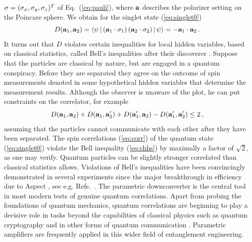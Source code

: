 \documentclass[12pt,amsmath,amssymb]{article}
\numberwithin{equation}{section}
\begin{document}
${\bf \sigma} = (\sigma_x, \sigma_y, \sigma_z)^T$
of Eq.\ (\ref{eq:pauli}), where
${\bf a}$ describes the polarizer setting on the Poincare sphere.
We obtain for the singlet state (\ref{eq:singlet0})
\begin{equation}
\label{eq:corr}
D({\bf a}_1, {\bf a}_2)=
\langle\psi\,|\, ({\bf a}_1 \cdot {\bf \sigma}_1)\,
({\bf a}_2 \cdot {\bf \sigma}_2)\,|\,\psi\rangle
= -{\bf a}_1 \cdot {\bf a}_2 \,.
\end{equation}
It turns out \cite{Bellpaper,Bell}
that $D$ violates certain inequalities for local hidden variables,
based on classical statistics,
called Bell's inequalities after their discoverer \cite{Bellpaper}.
Suppose that the particles are classical by nature, but are engaged
in a quantum conspiracy.
Before they are separated they agree on the outcome of
spin measurements denoted in
some hypothetical hidden variables that determine the
measurement results.
Although the observer is unaware of the plot,
he can put constraints on the correlator,
for example \cite{CHHS,CS}
\begin{equation}
\label{eq:chhs}
D({\bf a}_1, {\bf a}_2) +
D({\bf a}_1, {\bf a}_2') +
D({\bf a}_1', {\bf a}_2) -
D({\bf a}_1', {\bf a}_2') \le 2\,,
\end{equation}
assuming that the particles
cannot communicate with each other after they have been separated.
The spin correlations (\ref{eq:corr}) of the quantum state
(\ref{eq:singlet0}) violate the Bell inequality (\ref{eq:chhs})
by maximally a factor of $\sqrt{2}$, as one may verify.
Quantum particles can be slightly stronger correlated than
classical statistics allows.
Violations of Bell's inequalities have been convincingly
demonstrated in several experiments
since the major breakthrough in efficiency due to Aspect
\cite{Aspect}, see e.g. Refs.\ \cite{Tittel,Weihs}.
The parametric downconverter \cite{MandelWolf,Shen}
is the central tool in most
modern tests of genuine quantum correlations.
Apart from probing the foundations of quantum mechanics,
quantum correlations are beginning to play a decisive role in
tasks beyond the capabilities of classical physics
such as quantum cryptography \cite{Bruss,Gisin}
and in other forms of quantum communication
\cite{BEZ,NielsenChuang}.
Parametric amplifiers are frequently applied in this wider field
of entanglement engineering.
\end{document}
